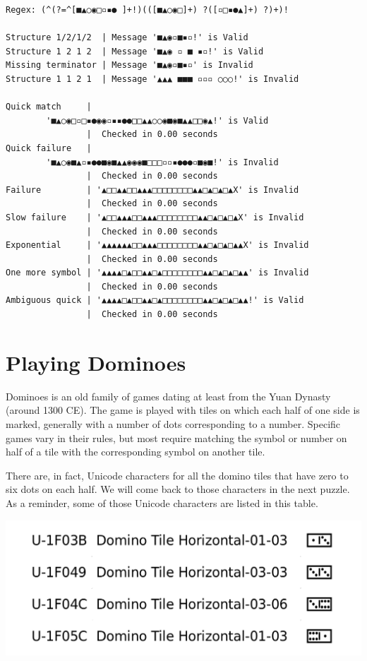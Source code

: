 \begin{verbatim}
Regex: (^(?=^[■▲○◉□▫▪● ]+!)(([■▲○◉□]+) ?([▫□▪●▲]+) ?)+)!

Structure 1/2/1/2  | Message '■▲◉▫■▪▫!' is Valid
Structure 1 2 1 2  | Message '■▲◉ ▫ ■ ▪▫!' is Valid
Missing terminator | Message '■▲◉▫■▪▫' is Invalid
Structure 1 1 2 1  | Message '▲▲▲ ■■■ ▫▫▫ ○○○!' is Invalid

Quick match     |
        '■▲○◉□▫□▪●◉◉▫▪▪●●□□▲▲○○◉■◉■▲▲□□◉▲!' is Valid
                |  Checked in 0.00 seconds
Quick failure   |
        '■▲○◉■▲▫▪●●■◉■▲▲◉◉◉■□□□▫▫▪●●●▫■◉■!' is Invalid
                |  Checked in 0.00 seconds
Failure         | '▲□□▲▲□□▲▲▲□□□□□□□□▲▲□▲□▲□▲X' is Invalid
                |  Checked in 0.00 seconds
Slow failure    | '▲□□▲▲▲□□▲▲▲□□□□□□□□▲▲□▲□▲□▲X' is Invalid
                |  Checked in 0.00 seconds
Exponential     | '▲▲▲▲▲▲□□▲▲▲□□□□□□□□▲▲□▲□▲□▲▲X' is Invalid
                |  Checked in 0.00 seconds
One more symbol | '▲▲▲▲□▲□□▲▲□▲□□□□□□□□▲▲□▲□▲□▲▲' is Invalid
                |  Checked in 0.00 seconds
Ambiguous quick | '▲▲▲▲□▲□□▲▲□▲□□□□□□□□▲▲□▲□▲□▲▲!' is Valid
                |  Checked in 0.00 seconds
\end{verbatim}

\newpage

\hypertarget{playing-dominoes}{%
\section{Playing Dominoes}\label{playing-dominoes}}

Dominoes is an old family of games dating at least from the Yuan Dynasty
(around 1300 CE). The game is played with tiles on which each half of
one side is marked, generally with a number of dots corresponding to a
number. Specific games vary in their rules, but most require matching
the symbol or number on half of a tile with the corresponding symbol on
another tile.

There are, in fact, Unicode characters for all the domino tiles that
have zero to six dots on each half. We will come back to those
characters in the next puzzle. As a reminder, some of those Unicode
characters are listed in this table.

\includegraphics{images/Dominoes-examples.png}

